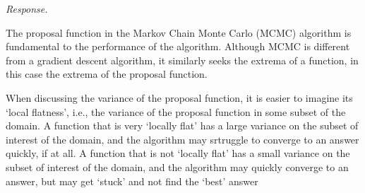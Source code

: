 \textit{Response.}

The proposal function in the Markov Chain Monte Carlo (MCMC) algorithm is fundamental to the performance of the algorithm. Although MCMC is different from a gradient descent algorithm, it similarly seeks the extrema of a function, in this case the extrema of the proposal function.

When discussing the variance of the proposal function, it is easier to imagine its `local flatness', i.e., the variance of the proposal function in some subset of the domain. A function that is very `locally flat' has a large variance on the subset of interest of the domain, and the algorithm may srtruggle to converge to an answer quickly, if at all. A function that is not `locally flat' has a small variance on the subset of interest of the domain, and the algorithm may quickly converge to an answer, but may get `stuck' and not find the `best' answer

 